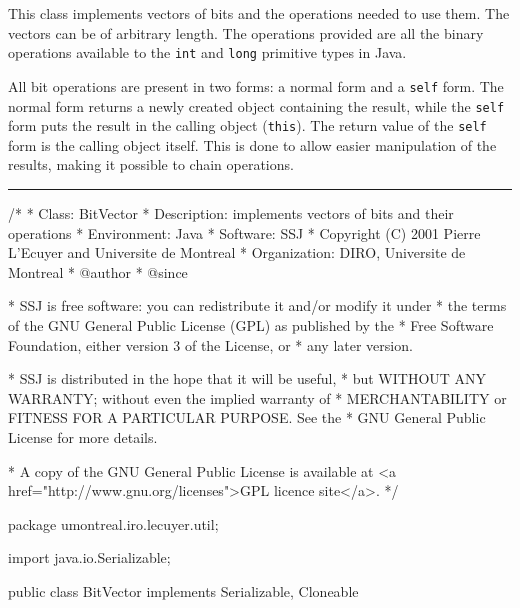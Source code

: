 
This class implements vectors of bits and the operations needed to use
them. The vectors can be of arbitrary length. The operations provided are
all the binary operations available to the \texttt{int} and \texttt{long}
primitive types in Java.

All bit operations are present in two forms: a normal form and a \texttt{self}
form. The normal form returns a newly created object containing the result,
while the \texttt{self} form puts the result in the calling object (\texttt{this}).
The return value of the \texttt{self} form is the calling object itself. This is
done to allow easier manipulation of the results, making it possible to 
chain operations.

\bigskip\hrule
\begin{code}\begin{hide}
/*
 * Class:        BitVector
 * Description:  implements vectors of bits and their operations
 * Environment:  Java
 * Software:     SSJ 
 * Copyright (C) 2001  Pierre L'Ecuyer and Universite de Montreal
 * Organization: DIRO, Universite de Montreal
 * @author       
 * @since

 * SSJ is free software: you can redistribute it and/or modify it under
 * the terms of the GNU General Public License (GPL) as published by the
 * Free Software Foundation, either version 3 of the License, or
 * any later version.

 * SSJ is distributed in the hope that it will be useful,
 * but WITHOUT ANY WARRANTY; without even the implied warranty of
 * MERCHANTABILITY or FITNESS FOR A PARTICULAR PURPOSE.  See the
 * GNU General Public License for more details.

 * A copy of the GNU General Public License is available at
   <a href="http://www.gnu.org/licenses">GPL licence site</a>.
 */
\end{hide}
package umontreal.iro.lecuyer.util; \begin{hide}

import java.io.Serializable;
\end{hide}


public class BitVector implements Serializable, Cloneable \begin{hide} {

   static final long serialVersionUID = -3448233092524725148L;

   private int[] v;       //the bits data
   private int length;    //number of data bits (in bits, not in bytes)

   private final static int all_1 = -1;  //integer with all bits set to 1
   private final static int one_1 = 1;   //integer with only his last bit set to 1
   /*
     Note sur le format interne du vecteur de bits :
     On fait toujours en sorte que les bits redondants (ceux qui apparaissent
     quand length %
     operations entre des vecteurs de longeurs differentes en posant que
     les bits manquants sur le plus petit des deux vecteurs ont la valeur 0.
   */
 \end{hide}
\end{code}
 
